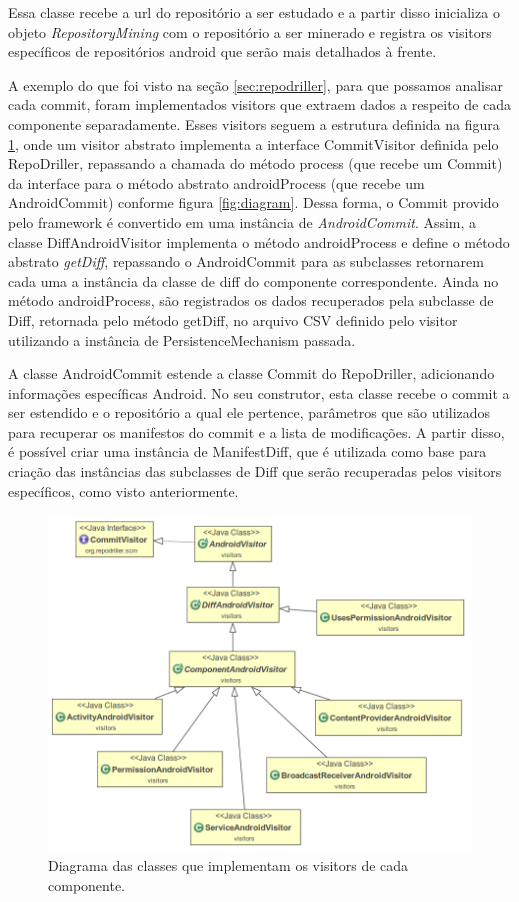 \documentclass[a4paper,12pt]{article}
\begin{document}
Essa classe recebe a url do repositório a ser estudado e a partir disso inicializa o objeto \textit{RepositoryMining} com o repositório a ser minerado e registra os visitors específicos de repositórios android que serão mais detalhados à frente.


A exemplo do que foi visto na seção \ref{sec:repodriller}, para que possamos analisar cada commit, foram implementados visitors que extraem dados a respeito de cada componente separadamente. Esses visitors seguem a estrutura definida na figura \ref{fig:visitors}, onde um visitor abstrato implementa a interface CommitVisitor definida pelo RepoDriller, repassando a chamada do método process (que recebe um Commit) da interface para o método abstrato androidProcess (que recebe um AndroidCommit) conforme figura \ref{fig:diagram}. Dessa forma, o Commit provido pelo framework é convertido em uma instância de \textit{AndroidCommit}. Assim, a classe DiffAndroidVisitor implementa o método androidProcess e define o método abstrato \textit{getDiff}, repassando o AndroidCommit para as subclasses retornarem cada uma a instância da classe de diff do componente correspondente. Ainda no método androidProcess, são registrados os dados recuperados pela subclasse de Diff, retornada pelo método getDiff, no arquivo CSV definido pelo visitor utilizando a instância de PersistenceMechanism passada.

A classe AndroidCommit estende a classe Commit do RepoDriller, adicionando informações específicas Android. No seu construtor, esta classe recebe o commit a ser estendido e o repositório a qual ele pertence, parâmetros que são utilizados para recuperar os manifestos do commit e a lista de modificações. A partir disso, é possível criar uma instância de ManifestDiff, que é utilizada como base para criação das instâncias das subclasses de Diff que serão recuperadas pelos visitors específicos, como visto anteriormente.


\begin{figure}[h]
\centering
\includegraphics[width=0.8\linewidth]{imgs/visitors.png}
\caption{Diagrama das classes que implementam os visitors de cada componente.}
\label{fig:visitors}
\end{figure}
\end{document}
